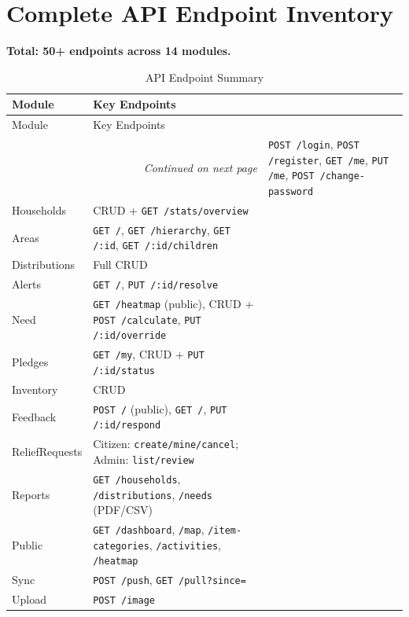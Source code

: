 
\section{Complete API Endpoint Inventory}
\textbf{Total: 50+ endpoints across 14 modules.}

\begin{longtable}{@{}ll@{}}
\caption{API Endpoint Summary}
\label{tab:api-endpoints}\\
\toprule
Module & Key Endpoints \\
\midrule
\endfirsthead
\toprule
Module & Key Endpoints \\
\midrule
\endhead
\midrule
\multicolumn{2}{r}{\textit{Continued on next page}}
\endfoot
\bottomrule
\endlastfoot
Auth & \texttt{POST /login}, \texttt{POST /register}, \texttt{GET /me}, \texttt{PUT /me}, \texttt{POST /change-password} \\
Households & CRUD + \texttt{GET /stats/overview} \\
Areas & \texttt{GET /}, \texttt{GET /hierarchy}, \texttt{GET /:id}, \texttt{GET /:id/children} \\
Distributions & Full CRUD \\
Alerts & \texttt{GET /}, \texttt{PUT /:id/resolve} \\
Need & \texttt{GET /heatmap} (public), CRUD + \texttt{POST /calculate}, \texttt{PUT /:id/override} \\
Pledges & \texttt{GET /my}, CRUD + \texttt{PUT /:id/status} \\
Inventory & CRUD \\
Feedback & \texttt{POST /} (public), \texttt{GET /}, \texttt{PUT /:id/respond} \\
ReliefRequests & Citizen: \texttt{create/mine/cancel}; Admin: \texttt{list/review} \\
Reports & \texttt{GET /households}, \texttt{/distributions}, \texttt{/needs} (PDF/CSV) \\
Public & \texttt{GET /dashboard}, \texttt{/map}, \texttt{/item-categories}, \texttt{/activities}, \texttt{/heatmap} \\
Sync & \texttt{POST /push}, \texttt{GET /pull?since=} \\
Upload & \texttt{POST /image} \\
\end{longtable}

